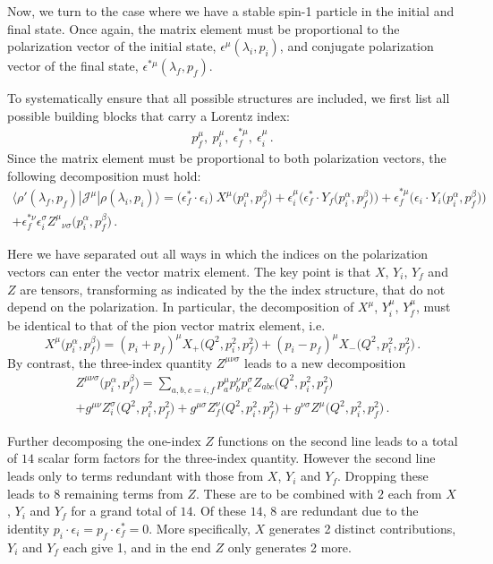 Now, we turn to the case where we have a stable spin-1 particle in the initial and final state. Once again, the matrix element must be proportional to the polarization vector of the initial state, $\epsilon^{\mu}(\lambda_i, p_i)$, and conjugate polarization vector of the final state, $\epsilon^{* \mu}(\lambda_f,p_f)$. {\mh To systematically ensure that all possible structures are included, we first list all possible building blocks that carry a Lorentz index:
\begin{gather}
p_f^\mu,\ p_i^\mu,\ \epsilon^{*\mu}_f,\ \epsilon_i^{\mu} \,.
\end{gather}
Since the matrix element must be proportional to both polarization vectors, the following decomposition must hold:
\begin{multline}
\langle\rho'(\lambda_f,p_f)|{\mathcal{J}}^{\mu}|\rho(\lambda_i,p_i)\rangle
=
\big ( \epsilon_f^*\cdot \epsilon_i \big ) \  {X}^\mu \big (p_i^\alpha,p_f^\beta \big)
+ \epsilon_i^\mu    \Big ( \epsilon_f^* \cdot {Y_f} \big (p_i^\alpha,p_f^\beta \big) \Big ) 
+ \epsilon_f^{*\mu}  \Big (  \epsilon_i \cdot {Y_i}  \big (p_i^\alpha,p_f^\beta \big)  \Big ) \\ 
+  \epsilon_f^{*\nu}   \epsilon_i^\sigma {Z^{\mu}}_{\nu \sigma}  \big (p_i^\alpha,p_f^\beta \big) \,.
\end{multline}
 
 Here we have separated out all ways in which the indices on the polarization vectors can enter the vector matrix element. The key point is that $X$, $Y_i$, $Y_f$ and $Z$ are tensors, transforming as indicated by the the index structure, that do not depend on the polarization. In particular, the decomposition of $X^\mu$, $Y_i^\mu$, $Y_f^\mu$, must be identical to that of the pion vector matrix element, i.e.
\begin{equation}
{X}^\mu \big (p_i^\alpha,p_f^\beta \big) = (p_i + p_f)^\mu X_+ \big (Q^2, p_i^2,p_f^2 \big) + (p_i - p_f)^\mu {X_-} \big (Q^2, p_i^2,p_f^2 \big) \,.
\end{equation}
By contrast, the three-index quantity $Z^{\mu \nu \sigma}$ leads to a new decomposition
\begin{multline}
Z^{\mu \nu \sigma} \big (p_i^\alpha,p_f^\beta \big) = \sum_{a,b,c=i,f} p_a^\mu p_b^\nu p_c^\sigma Z_{abc} \big (Q^2, p_i^2,p_f^2 \big) \\ 
+ g^{\mu \nu}  Z^\sigma_i \big (Q^2, p_i^2,p_f^2 \big) + g^{\mu \sigma}  Z^\nu_f \big (Q^2, p_i^2,p_f^2 \big) + g^{\nu \sigma}  Z^\mu \big (Q^2, p_i^2,p_f^2 \big) \,.
\end{multline}

Further decomposing the one-index $Z$ functions on the second line leads to a total of $14$ scalar form factors for the three-index quantity. However the second line leads only to terms redundant with those from $X$, $Y_i$ and $Y_f$. Dropping these leads to $8$ remaining terms from $Z$. These are to be combined with $2$ each from $X$, $Y_i$ and $Y_f$ for a grand total of $14$. Of these $14$, $8$ are redundant due to the identity $p_i\cdot \epsilon_i=p_f\cdot \epsilon_f^*=0$. More specifically, $X$ generates 2 distinct contributions, $Y_i$ and $Y_f$ each give 1, and in the end $Z$ only generates 2 more.}




